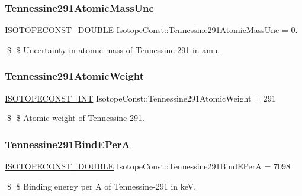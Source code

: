 \subsubsection{\texorpdfstring{Tennessine291\+Atomic\+Mass\+Unc}{Tennessine291AtomicMassUnc}}
{\footnotesize\ttfamily \mbox{\hyperlink{group___isotope_const-_macros_ga8f45a7272ce02c0b4c65c44636ed719a}{I\+S\+O\+T\+O\+P\+E\+C\+O\+N\+S\+T\+\_\+\+D\+O\+U\+B\+LE}} Isotope\+Const\+::\+Tennessine291\+Atomic\+Mass\+Unc = 0.}

\$ \$ Uncertainty in atomic mass of Tennessine-\/291 in amu. \mbox{\label{group___isotope_const-_tennessine-_ts291_ga435ee806953c75914dfcd40ef6537429}} 
\subsubsection{\texorpdfstring{Tennessine291\+Atomic\+Weight}{Tennessine291AtomicWeight}}
{\footnotesize\ttfamily \mbox{\hyperlink{group___isotope_const-_macros_ga5f18360b3e99483a35c32d789e62621c}{I\+S\+O\+T\+O\+P\+E\+C\+O\+N\+S\+T\+\_\+\+I\+NT}} Isotope\+Const\+::\+Tennessine291\+Atomic\+Weight = 291}

\$ \$ Atomic weight of Tennessine-\/291. \mbox{\label{group___isotope_const-_tennessine-_ts291_gaa7cc05b5fd05132deebfd5181dd392c1}} 
\subsubsection{\texorpdfstring{Tennessine291\+Bind\+E\+PerA}{Tennessine291BindEPerA}}
{\footnotesize\ttfamily \mbox{\hyperlink{group___isotope_const-_macros_ga8f45a7272ce02c0b4c65c44636ed719a}{I\+S\+O\+T\+O\+P\+E\+C\+O\+N\+S\+T\+\_\+\+D\+O\+U\+B\+LE}} Isotope\+Const\+::\+Tennessine291\+Bind\+E\+PerA = 7098}

\$ \$ Binding energy per A of Tennessine-\/291 in keV. \mbox{\label{group___isotope_const-_tennessine-_ts291_gaed63145481564faa9c851c44f3581a2a}} 

